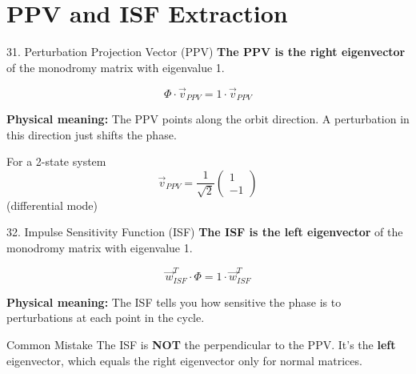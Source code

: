 \documentclass[aspectratio=169, 11pt]{beamer}
\begin{document}

\section{PPV and ISF Extraction}

\begin{frame}{31. Perturbation Projection Vector (PPV)}
    \textbf{The PPV is the right eigenvector} of the monodromy matrix with eigenvalue 1.

    \vspace{0.5em}
    \[ \Phi \cdot \vec{v}_{PPV} = 1 \cdot \vec{v}_{PPV} \]

    \vspace{0.5em}
    \textbf{Physical meaning:} The PPV points along the orbit direction. A perturbation in this direction just shifts the phase.

    \vspace{0.5em}
    \begin{block}{For a 2-state system}
        \[ \vec{v}_{PPV} = \frac{1}{\sqrt{2}} \begin{pmatrix} 1 \\ -1 \end{pmatrix} \]
        (differential mode)
    \end{block}
\end{frame}

\begin{frame}{32. Impulse Sensitivity Function (ISF)}
    \textbf{The ISF is the left eigenvector} of the monodromy matrix with eigenvalue 1.

    \vspace{0.5em}
    \[ \vec{w}_{ISF}^T \cdot \Phi = 1 \cdot \vec{w}_{ISF}^T \]

    \vspace{0.5em}
    \textbf{Physical meaning:} The ISF tells you how sensitive the phase is to perturbations at each point in the cycle.

    \vspace{0.5em}
    \begin{alertblock}{Common Mistake}
        The ISF is \textbf{NOT} the perpendicular to the PPV. It's the \textbf{left} eigenvector, which equals the right eigenvector only for normal matrices.
    \end{alertblock}
\end{frame}
\end{document}
